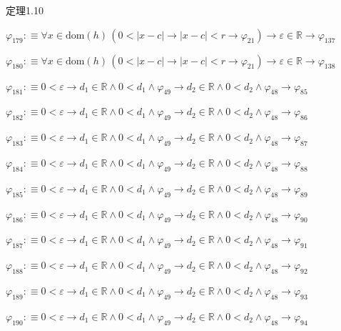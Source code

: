 \begin{fullproof}{定理1.10}
\begin{abbrevlist}
\item $\varphi_{179} :\equiv \forall x \in \mathrm{dom}(h)\,(0 < \lvert x - c \rvert \to \lvert x - c \rvert < r \to \varphi_{21}) \to \varepsilon \in \mathbb{R} \to \varphi_{137}$
\item $\varphi_{180} :\equiv \forall x \in \mathrm{dom}(h)\,(0 < \lvert x - c \rvert \to \lvert x - c \rvert < r \to \varphi_{21}) \to \varepsilon \in \mathbb{R} \to \varphi_{138}$
\item $\varphi_{181} :\equiv 0 < \varepsilon \to d_{1} \in \mathbb{R} \land 0 < d_{1} \land \varphi_{49} \to d_{2} \in \mathbb{R} \land 0 < d_{2} \land \varphi_{48} \to \varphi_{85}$
\item $\varphi_{182} :\equiv 0 < \varepsilon \to d_{1} \in \mathbb{R} \land 0 < d_{1} \land \varphi_{49} \to d_{2} \in \mathbb{R} \land 0 < d_{2} \land \varphi_{48} \to \varphi_{86}$
\item $\varphi_{183} :\equiv 0 < \varepsilon \to d_{1} \in \mathbb{R} \land 0 < d_{1} \land \varphi_{49} \to d_{2} \in \mathbb{R} \land 0 < d_{2} \land \varphi_{48} \to \varphi_{87}$
\item $\varphi_{184} :\equiv 0 < \varepsilon \to d_{1} \in \mathbb{R} \land 0 < d_{1} \land \varphi_{49} \to d_{2} \in \mathbb{R} \land 0 < d_{2} \land \varphi_{48} \to \varphi_{88}$
\item $\varphi_{185} :\equiv 0 < \varepsilon \to d_{1} \in \mathbb{R} \land 0 < d_{1} \land \varphi_{49} \to d_{2} \in \mathbb{R} \land 0 < d_{2} \land \varphi_{48} \to \varphi_{89}$
\item $\varphi_{186} :\equiv 0 < \varepsilon \to d_{1} \in \mathbb{R} \land 0 < d_{1} \land \varphi_{49} \to d_{2} \in \mathbb{R} \land 0 < d_{2} \land \varphi_{48} \to \varphi_{90}$
\item $\varphi_{187} :\equiv 0 < \varepsilon \to d_{1} \in \mathbb{R} \land 0 < d_{1} \land \varphi_{49} \to d_{2} \in \mathbb{R} \land 0 < d_{2} \land \varphi_{48} \to \varphi_{91}$
\item $\varphi_{188} :\equiv 0 < \varepsilon \to d_{1} \in \mathbb{R} \land 0 < d_{1} \land \varphi_{49} \to d_{2} \in \mathbb{R} \land 0 < d_{2} \land \varphi_{48} \to \varphi_{92}$
\item $\varphi_{189} :\equiv 0 < \varepsilon \to d_{1} \in \mathbb{R} \land 0 < d_{1} \land \varphi_{49} \to d_{2} \in \mathbb{R} \land 0 < d_{2} \land \varphi_{48} \to \varphi_{93}$
\item $\varphi_{190} :\equiv 0 < \varepsilon \to d_{1} \in \mathbb{R} \land 0 < d_{1} \land \varphi_{49} \to d_{2} \in \mathbb{R} \land 0 < d_{2} \land \varphi_{48} \to \varphi_{94}$

\end{abbrevlist}
\end{fullproof}

